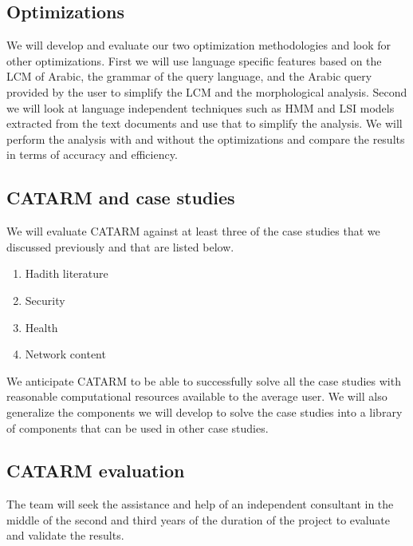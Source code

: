 \documentclass[12pt]{article}
\begin{document}
\subsection{Optimizations}

We will develop and evaluate our two optimization methodologies
and look for other optimizations. 
First we will use language specific features based on the 
LCM of Arabic, the grammar of the query language, and 
the Arabic query provided by the user to simplify 
the LCM and the morphological analysis. 
Second we will look at language independent techniques
such as HMM and LSI models extracted from the 
text documents and use that to simplify the analysis. 
We will perform the analysis with and without the optimizations
and compare the results in terms of accuracy and efficiency. 

\subsection{CATARM and case studies }

We will evaluate CATARM against at least three of the case studies
that we discussed previously and that are listed below. 
\begin{enumerate}
\item Hadith literature
\item Security
\item Health
\item Network content
\end{enumerate}

We anticipate CATARM to be able to successfully solve all the case
studies with reasonable computational resources available to the 
average user. 
We will also generalize the components we will develop to solve
the case studies into a library of components that can be used
in other case studies. 

\subsection{CATARM evaluation } 

The team will seek the assistance and help of an independent 
consultant in the middle of the second and third years of 
the duration of the project to evaluate and validate the results.
\end{document}
